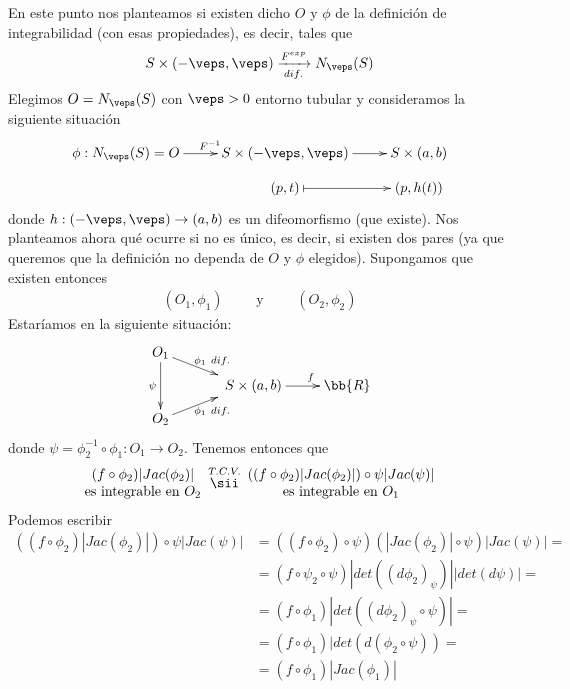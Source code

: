 En este punto nos planteamos si existen dicho $O$ y $\phi$ de la definición de integrabilidad (con esas propiedades), es decir, tales que 
\begin{gather*}
    S \times (-\veps, \veps) \xrightarrow[dif.]{F^{exp}} N_\veps(S)
\end{gather*}
Elegimos $O=N_\veps(S)$ con $\veps>0$ entorno tubular y consideramos la siguiente situación
\begin{gather*}
    \xymatrix@R=3mm {
        \phi : N_\veps(S) = O \ar[r]^{\ \ F^{-1}} & S\times (-\veps, \veps) \ar[r] & S\times(a,b)\\
        & (p,t) \ar@{|->}[r] & (p,h(t))
    }
\end{gather*}
donde $h:(-\veps, \veps) \to (a,b)$ es un difeomorfismo (que existe). Nos planteamos ahora qué ocurre si no es único, es decir, si existen dos pares (ya que queremos que la definición no dependa de $O$ y $\phi$ elegidos). Supongamos que existen entonces
\begin{gather*}
    (O_1, \phi_1) \qquad \text{ y } \qquad (O_2, \phi_2)
\end{gather*}
Estaríamos en la siguiente situación:
\begin{gather*}
    \xymatrix@R=3mm{
        O_1 \ar[dr]^{\phi_1\ dif.} \ar[dd]_{\psi}\\
        & \quad S\times(a,b) \ar[r]^{\qquad f} & \bb{R}\\
        O_2 \ar[ur]_{\phi_1\ dif.}
    }
\end{gather*}
donde $\psi = \phi_2^{-1}\circ \phi_1: O_1 \to O_2$. Tenemos entonces que 
\begin{gather*}
    \begin{array}{c}
        (f \circ \phi_2)|Jac(\phi_2)|\\
        \text{es integrable en $O_2$}
    \end{array}
    \overset{T.C.V.}{\sii}
    \begin{array}{c}
        ((f\circ \phi_2)|Jac(\phi_2)|) \circ \psi |Jac(\psi)|\\
        \text{es integrable en $O_1$}
    \end{array}
\end{gather*}
Podemos escribir
\begin{align*}
    ((f\circ \phi_2)|Jac(\phi_2)|) \circ \psi |Jac(\psi)| &= 
    ((f\circ \phi_2)\circ \psi)(|Jac(\phi_2)| \circ \psi)|Jac(\psi)| = \\
    &=
    (f\circ \psi_2 \circ \psi) |det((d\phi_2)_\psi)||det(d\psi)| = \\
    &=
    (f \circ \phi_1)|det((d\phi_2)_\psi \circ \psi)| = \\
    &=
    (f\circ \phi_1)|det(d(\phi_2 \circ \psi)) =\\
    &=
    (f\circ \phi_1)|Jac(\phi_1)|
\end{align*}
